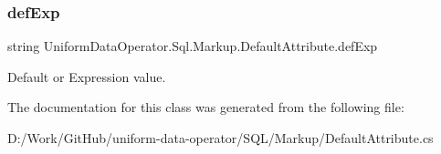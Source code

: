 \subsubsection{\texorpdfstring{def\+Exp}{defExp}}
{\footnotesize\ttfamily string Uniform\+Data\+Operator.\+Sql.\+Markup.\+Default\+Attribute.\+def\+Exp}



Default or Expression value. 



The documentation for this class was generated from the following file\+:\begin{DoxyCompactItemize}
\item 
D\+:/\+Work/\+Git\+Hub/uniform-\/data-\/operator/\+S\+Q\+L/\+Markup/Default\+Attribute.\+cs\end{DoxyCompactItemize}
